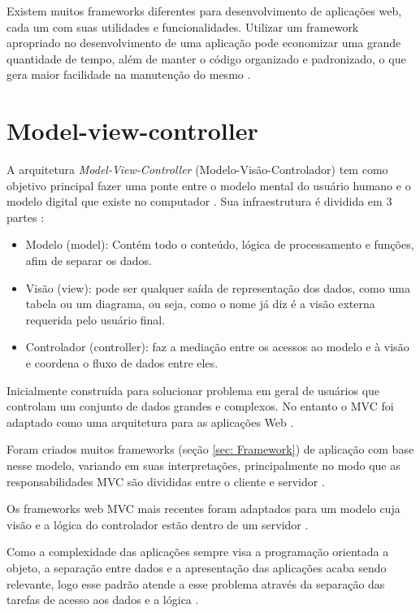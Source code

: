 Existem muitos frameworks diferentes para desenvolvimento de aplicações web, cada um com suas utilidades e funcionalidades. Utilizar um framework apropriado no desenvolvimento de uma aplicação pode economizar uma grande quantidade de tempo, além de manter o código organizado e padronizado, o que gera maior facilidade na manutenção do mesmo \cite{FrameworkDocForge}.

\section{Model-view-controller}
\label{sec: MVC}

A arquitetura \textit{Model-View-Controller} (Modelo-Visão-Controlador) tem como objetivo principal fazer uma ponte entre o modelo mental do usuário humano e o modelo digital que existe no computador \cite{Trygve/MVC}.
Sua infraestrutura é dividida em 3 partes \cite{MVC}:

\begin{itemize}
    \item Modelo (model): Contém todo o conteúdo, lógica de processamento e funções, afim de separar os dados.
    \item Visão (view): pode ser qualquer saída de representação dos dados, como uma tabela ou um diagrama, ou seja, como o nome já diz é a visão externa requerida pelo usuário final.
    \item Controlador (controller): faz a mediação entre os acessos ao modelo e à visão e coordena o fluxo de dados entre eles.
\end{itemize}

Inicialmente construída para solucionar problema em geral de usuários que controlam um conjunto de dados grandes e complexos. No entanto o MVC foi adaptado como uma arquitetura para as aplicações Web \cite{WikipediaMVC}.

Foram criados muitos frameworks (seção \ref{sec: Framework}) de aplicação com base nesse modelo, variando em suas interpretações, principalmente no modo que as responsabilidades MVC são divididas entre o cliente e servidor \cite{WikipediaMVC}.

Os frameworks web MVC mais recentes foram adaptados para um modelo cuja visão e a lógica do controlador estão dentro de um servidor \cite{WikipediaMVC}.

Como a complexidade das aplicações sempre visa a programação orientada a objeto, a separação entre dados e a apresentação das aplicações acaba sendo relevante, logo esse padrão atende a esse problema através da separação das tarefas de acesso aos dados e a lógica \cite{WikipediaMVC}.


